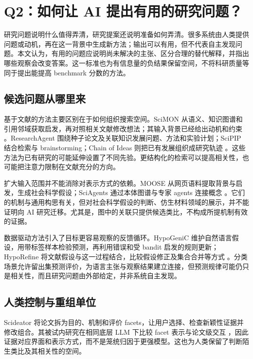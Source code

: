 \section{Q2：如何让 AI 提出有用的研究问题？}
\label{sec:questions}

研究问题说明什么值得弄清，研究提案还说明准备如何弄清。很多系统由人类提供问题或动机，再在这一背景中生成新方法；输出可以有用，但不代表自主发现问题。本文认为，有用的问题应说明尚未解决的主张、区分合理的替代解释，并指出哪些观察会改变答案。这一标准也为有信息量的负结果保留空间，不将科研质量等同于提出能提高 benchmark 分数的方法。

\subsection{候选问题从哪里来}

基于文献的方法主要区别在于如何组织搜索空间。SciMON 从语义、知识图谱和引用邻域获取启发，再对照相关文献修改想法；其输入背景已经给出动机和约束 \cite{scimon}。ResearchAgent 围绕种子论文及关联知识发展问题、方法和实验计划；SciPIP 结合检索与 brainstorming；Chain of Ideas 则把已有发展组织成研究轨迹 \cite{researchagent,scipip,chain-of-ideas}。这些方法为已有研究的可能延伸设置了不同先验。更结构化的检索可以提高相关性，也可能把注意力限制在文献充分的方向。

扩大输入范围并不能消除对表示方式的依赖。MOOSE 从网页语料提取背景与启发，生成社会科学假设；SciAgents 通过本体图谱与专家 agents 连接概念 \cite{moose,sciagents}。它们的机制与通用构思有关，但对社会科学假设的判断、仿生材料领域的展示，并不能证明向 AI 研究迁移。尤其是，图中的关联只提供候选类比，不构成所提机制有效的证据。

数据驱动方法引入了目标更容易观察的反馈循环。HypoGeniC 维护自然语言假设，用带标签样本检验预测，再利用错误和受 bandit 启发的规则更新；HypoRefine 将文献假设与这一过程结合，比较假设修正及集合合并等方式 \cite{hypogenic,hyporefine}。分类场景允许留出集预测评价，为语言主张与观察结果建立连接，但预测规律可能仍只是相关性，而且研究问题由外部给定，并非系统自主发现。

\subsection{人类控制与重组单位}

Scideator 将论文拆为目的、机制和评价 facets，让用户选择、检查新颖性证据并修改组合。其被试内研究在相同底层 LLM 下比较 facet 表示与论文级交互 \cite{scideator}，因此证据对应界面和表示方式，而不是笼统归因于更强模型。这也为人类保留了判断陌生类比及其相关性的空间。

